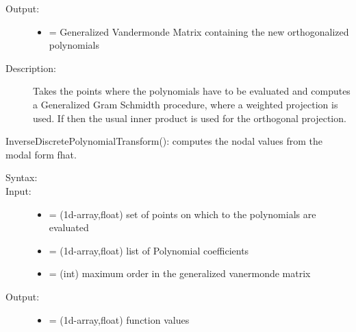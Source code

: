 \documentclass[letterpaper,10pt,english]{sphinxmanual}
\begin{document}
\begin{fulllineitems}
\begin{fulllineitems}
\begin{description}
\begin{itemize}
\end{itemize}

\item[{Output:}] \leavevmode\begin{itemize}
\item {} 
 = Generalized Vandermonde Matrix containing the new orthogonalized polynomials

\end{itemize}

\item[{Description:}] \leavevmode
Takes the points where the polynomials have to be evaluated and computes a Generalized Gram Schmidth procedure, where a weighted projection is used. If  then the usual inner product is used for the orthogonal projection.

\end{description}

\end{fulllineitems}


\begin{fulllineitems}
\label{index:SpectralToolbox.Spectral1D.Poly1D.InverseDiscretePolynomialTransform}
InverseDiscretePolynomialTransform(): computes the nodal values from the modal form fhat.
\begin{description}
\item[{Syntax:}] \leavevmode
{}

\item[{Input:}] \leavevmode\begin{itemize}
\item {} 
 = (1d-array,float) set of points on which to the polynomials are evaluated

\item {} 
 = (1d-array,float) list of Polynomial coefficients

\item {} 
 = (int) maximum order in the generalized vanermonde matrix

\end{itemize}

\item[{Output:}] \leavevmode\begin{itemize}
\item {} 
 = (1d-array,float) function values


\end{itemize}
\end{description}
\end{fulllineitems}
\end{fulllineitems}
\end{document}
